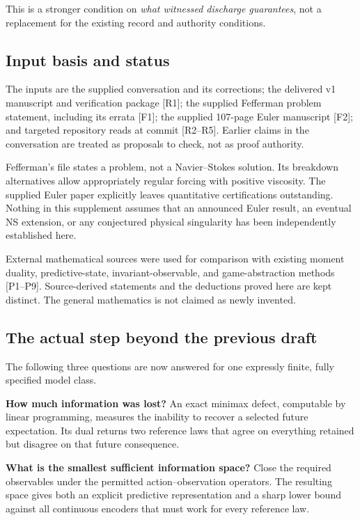 \documentclass[11pt,a4paper]{article}
\begin{document}
This is a stronger condition on \emph{what witnessed discharge
guarantees}, not a replacement for the existing record and authority
conditions.

\subsection{Input basis and status}\label{input-basis-and-status}

The inputs are the supplied conversation and its corrections; the
delivered v1 manuscript and verification package {[}R1{]}; the supplied
Fefferman problem statement, including its errata {[}F1{]}; the supplied
107-page Euler manuscript {[}F2{]}; and targeted repository reads at
commit  {[}R2--R5{]}.
Earlier claims in the conversation are treated as proposals to check,
not as proof authority.

Fefferman's file states a problem, not a Navier--Stokes solution. Its
breakdown alternatives allow appropriately regular forcing with positive
viscosity. The supplied Euler paper explicitly leaves quantitative
certifications outstanding. Nothing in this supplement assumes that an
announced Euler result, an eventual NS extension, or any conjectured
physical singularity has been independently established here.

External mathematical sources were used for comparison with existing
moment duality, predictive-state, invariant-observable, and
game-abstraction methods {[}P1--P9{]}. Source-derived statements and the
deductions proved here are kept distinct. The general mathematics is not
claimed as newly invented.

\subsection{The actual step beyond the previous
draft}\label{the-actual-step-beyond-the-previous-draft}

The following three questions are now answered for one expressly finite,
fully specified model class.

\textbf{How much information was lost?} An exact minimax defect,
computable by linear programming, measures the inability to recover a
selected future expectation. Its dual returns two reference laws that
agree on everything retained but disagree on that future consequence.

\textbf{What is the smallest sufficient information space?} Close the
required observables under the permitted action--observation operators.
The resulting space gives both an explicit predictive representation and
a sharp lower bound against all continuous encoders that must work for
every reference law.
\end{document}
